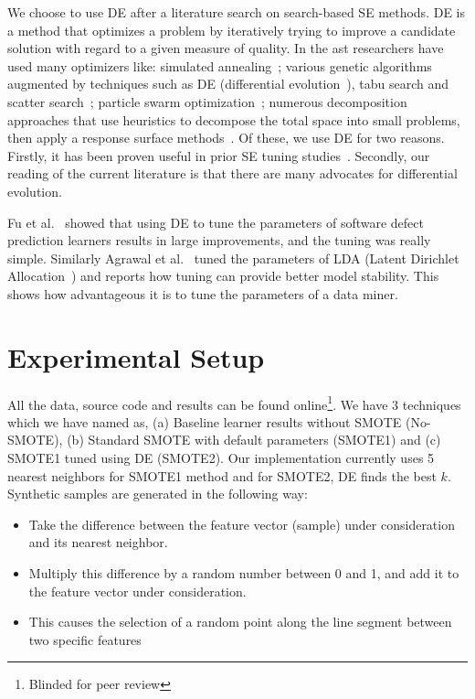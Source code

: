 \documentclass[sigconf,review, anonymous]{acmart}
\newcommand{\bi}{\begin{itemize}[leftmargin=0.4cm]}
\newcommand{\ei}{\end{itemize}}
\theoremstyle{break}
\theoremstyle{break}
\begin{document}
We choose to use DE after a literature search on search-based SE methods. DE is a method that optimizes a problem by iteratively trying to improve a candidate solution with regard to a given measure of quality.
In the ast researchers have used many optimizers like: simulated
annealing~\cite{feather2002converging, menzies2007business}; various genetic
algorithms~\cite{goldberg1979complexity} augmented by techniques such as
DE (differential evolution~\cite{storn1997differential}), tabu search and scatter
search~\cite{glover1986general, beausoleil2006moss, molina2007sspmo,nebro2008abyss}; particle swarm optimization~\cite{pan2008particle}; numerous
decomposition approaches that use heuristics to decompose the total space into
small problems, then apply a response surface methods~\cite{krall2015gale, zuluaga2013active}.
Of these, we use DE for two reasons. Firstly, it has been proven useful in prior SE tuning
studies~\cite{fu2016tuning, agrawal2016wrong}. Secondly, our reading of the current literature is
that there are many advocates for differential evolution.

Fu et al.~\cite{fu2016tuning} showed that using DE to tune the parameters of software defect prediction learners results in large improvements, and the tuning was really simple. Similarly Agrawal et al.~\cite{agrawal2016wrong} tuned the parameters of LDA (Latent Dirichlet Allocation~\cite{blei2003latent}) and reports how tuning can provide better model stability. This shows how advantageous it is to tune the parameters of a data miner.

\section{Experimental Setup}
\label{sect:experiment}

All the data, source code and results can be found online\footnote{Blinded for peer review}.
We have 3 techniques which we have named as, (a) Baseline learner results without SMOTE (No-SMOTE), (b) Standard SMOTE with default parameters (SMOTE1) and (c) SMOTE1 tuned using DE (SMOTE2).  Our implementation currently uses 5 nearest neighbors for SMOTE1 method and for SMOTE2, DE finds the best $k$. Synthetic samples
are generated in the following way:
\bi
\item
Take the difference between the feature vector (sample)
under consideration and its nearest neighbor.
\item
Multiply this difference by a random number
between 0 and 1, and add it to the feature vector under consideration.
\item
This causes the
selection of a random point along the line segment between two specific features
\ei
\end{document}

